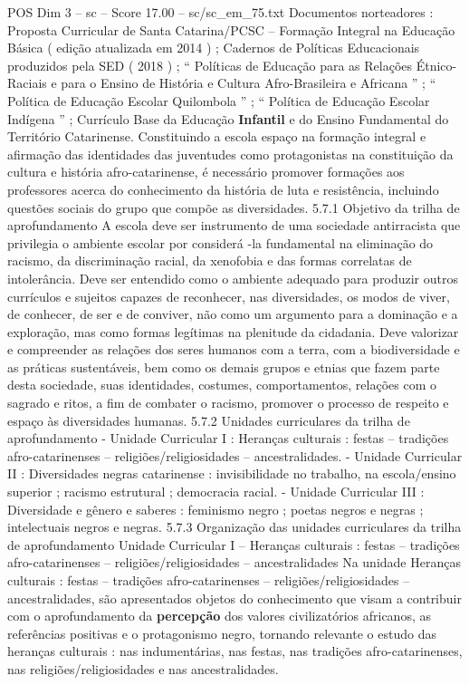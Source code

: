 \begin{textsample}{POS Dim 3 – sc – Score 17.00 – sc/sc\_em\_75.txt}
Documentos norteadores : Proposta Curricular de Santa Catarina/PCSC – Formação Integral na Educação Básica ( edição atualizada em 2014 ) ; Cadernos de Políticas Educacionais produzidos pela SED ( 2018 ) ; “ Políticas de Educação para as Relações Étnico-Raciais e para o Ensino de História e Cultura Afro-Brasileira e Africana ” ; “ Política de Educação Escolar Quilombola ” ; “ Política de Educação Escolar Indígena ” ; Currículo Base da Educação \textbf{Infantil} e do Ensino Fundamental do Território Catarinense.
Constituindo a escola espaço na formação integral e afirmação das identidades das juventudes como protagonistas na constituição da cultura e história afro-catarinense, é necessário promover formações aos professores acerca do conhecimento da história de luta e resistência, incluindo questões sociais do grupo que compõe as diversidades. 5.7.1 Objetivo da trilha de aprofundamento A escola deve ser instrumento de uma sociedade antirracista que privilegia o ambiente escolar por considerá -la fundamental na eliminação do racismo, da discriminação racial, da xenofobia e das formas correlatas de intolerância.
Deve ser entendido como o ambiente adequado para produzir outros currículos e sujeitos capazes de reconhecer, nas diversidades, os modos de viver, de conhecer, de ser e de conviver, não como um argumento para a dominação e a exploração, mas como formas legítimas na plenitude da cidadania.
Deve valorizar e compreender as relações dos seres humanos com a terra, com a biodiversidade e as práticas sustentáveis, bem como os demais grupos e etnias que fazem parte desta sociedade, suas identidades, costumes, comportamentos, relações com o sagrado e ritos, a fim de combater o racismo, promover o processo de respeito e espaço às diversidades humanas. 5.7.2 Unidades curriculares da trilha de aprofundamento - Unidade Curricular I : Heranças culturais : festas – tradições afro-catarinenses – religiões/religiosidades – ancestralidades. - Unidade Curricular II : Diversidades negras catarinense : invisibilidade no trabalho, na escola/ensino superior ; racismo estrutural ; democracia racial. - Unidade Curricular III : Diversidade e gênero e saberes : feminismo negro ; poetas negros e negras ; intelectuais negros e negras. 5.7.3 Organização das unidades curriculares da trilha de aprofundamento Unidade Curricular I – Heranças culturais : festas – tradições afro-catarinenses – religiões/religiosidades – ancestralidades Na unidade Heranças culturais : festas – tradições afro-catarinenses – religiões/religiosidades – ancestralidades, são apresentados objetos do conhecimento que visam a contribuir com o aprofundamento da \textbf{percepção} dos valores civilizatórios africanos, as referências positivas e o protagonismo negro, tornando relevante o estudo das heranças culturais : nas indumentárias, nas festas, nas tradições afro-catarinenses, nas religiões/religiosidades e nas ancestralidades.

\end{textsample}
